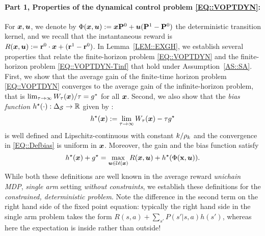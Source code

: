 \paragraph{Part 1, Properties of the dynamical control problem \eqref{EQ::VOPTDYN}:} For ${\bm{x}},\bm{u}$, we denote by $\Phi({\bm{x}}, \bm{u}) := {\bm{x}}\mathbf{P}^{0} + \bm{u} (\mathbf{P}^{1} - \mathbf{P}^{0})$ the deterministic transition kernel, and we recall that the instantaneous reward is $R({\bm{x}}, \bm{u}) := \mathbf{r}^{0}\cdot {\bm{x}} + (\mathbf{r}^{1} - \mathbf{r}^{0})$. In Lemma~\ref{LEM::EXGH},
we establish several properties that relate the finite-horizon problem \eqref{EQ::VOPTDYN} and the finite-horizon problem \eqref{EQ::VOPTDYN-Tinf} that hold under Assumption~\ref{AS::SA}. First, we show that the average gain of the finite-time horizon problem \eqref{EQ::VOPTDYN} converges to the average gain of the infinite-horizon problem, that is $\lim_{\tau\to\infty} W_\tau({\bm{x}})/\tau = g^*$ for all ${\bm{x}}$. Second, we also show that the \emph{bias function} $h^{\star}(\cdot) : \Delta_{\mathcal{S}} \to \mathbb{R}$ given by :
\begin{equation}\label{EQ::Defbias}
    h^{\star}({\bm{x}}) := \lim_{\tau \to \infty} W_{\tau}{({\bm{x}})} - \tau g^{\star}
\end{equation} 
is well defined and Lipschitz-continuous with constant $k/\rho_k$ and the convergence in \eqref{EQ::Defbias} is uniform in ${\bm{x}}$. Moreover, the gain and the bias function satisfy  
\begin{equation}\label{EQ::FIXEDPT}
    h^{\star}({\bm{x}}) + g^{\star} = \max_{\bm{u} \in \mathcal{U}({\bm{x}})} R({\bm{x}}, \bm{u}) + h^{\star}(\Phi(\textbf{x}, \bm{u})).
\end{equation} 
While both these definitions are well known in the average reward \emph{unichain MDP}, \emph{single arm} setting \emph{without constraints}, %
we establish these definitions for the \emph{constrained, deterministic problem}. Note the difference in the second term on the right hand side of the fixed point equation: typically the right hand side in the single arm problem takes the form $R(s, a) + \sum_{s'}P(s'|s, a) h(s')$, whereas here the expectation is inside rather than outside! %

